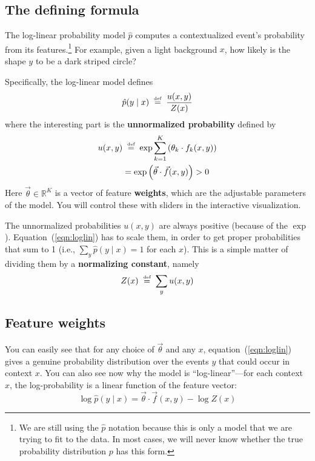 \documentclass[11pt]{article}
\newcommand{\defeq}{\;\stackrel{\mbox{\tiny def}}{=}\;}
\newcommand{\vtheta}{\vec{\theta}}
\newcommand{\ph}{\hat{p}}
\newcommand{\Real}{{\mathbb R}}
\begin{document}
\subsection{The defining formula}

The log-linear probability model $\ph$ computes a contextualized
event's probability from its features.\footnote{We are still using the
  $\ph$ notation because this is only a model that we are trying to
  fit to the data.  In most cases, we will never know whether the true
  probability distribution $p$ has this form.}  For example, given a
light background $x$, how likely is the shape $y$ to be a dark striped circle?

Specifically, the log-linear model defines
\begin{equation}\label{eqn:loglin}
  \ph(y \mid x) \defeq \frac{u(x,y)}{Z(x)}
\end{equation}
where the interesting part is the {\bf unnormalized probability}
defined by
\begin{align}\label{eqn:unnorm}
  u(x,y) &\defeq \exp \sum_{k=1}^K \left( \theta_k \cdot f_k(x,y) \right)  \\
         &= \exp \left(\vtheta \cdot \vec{f}(x,y)\right) > 0
\end{align}
Here $\vtheta \in \Real^K$ is a vector of feature {\bf weights}, which
are the adjustable parameters of the model.  You will control these
with sliders in the interactive visualization.

The unnormalized probabilities $u(x,y)$ are always positive (because of the $\exp$).
Equation~(\ref{eqn:loglin}) has to scale them, in order to get proper
probabilities that sum to 1 (i.e., $\sum_y \ph(y\mid x) = 1$ for each
$x$).  This is a simple matter of dividing them by a {\bf normalizing
  constant}, namely
\begin{equation}
  Z(x) \defeq \sum_y u(x,y)
\end{equation}

\subsection{Feature weights}

You can easily see that for any choice of $\vtheta$ and any $x$,
equation~(\ref{eqn:loglin}) gives a genuine probability distribution
over the events $y$ that could occur in context $x$.  You can also see
now why the model is ``log-linear''---for each context $x$, the
log-probability is a linear function of the feature vector:
\begin{equation}\label{eqn:logversion}
\log \ph(y \mid x) = \vtheta \cdot \vec{f}(x,y) - \log Z(x)
\end{equation}
\end{document}
